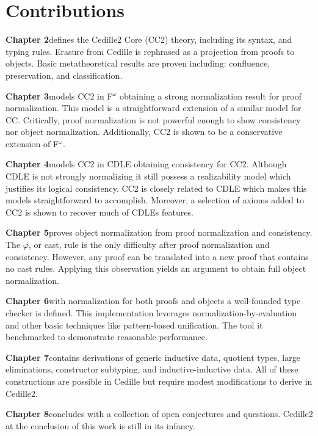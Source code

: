 \section{Contributions}

\textbf{Chapter 2}\quad defines the Cedille2 Core (CC2) theory, including its syntax, and typing rules.
Erasure from Cedille is rephrased as a projection from proofs to objects.
Basic metatheoretical results are proven including: confluence, preservation, and classification.

\textbf{Chapter 3}\quad models CC2 in F$^\omega$ obtaining a strong normalization result for proof normalization.
This model is a straightforward extension of a similar model for CC.
Critically, proof normalization is not powerful enough to show consistency nor object normalization.
Additionally, CC2 is shown to be a conservative extension of F$^\omega$.

\textbf{Chapter 4}\quad models CC2 in CDLE obtaining consistency for CC2.
Although CDLE is not strongly normalizing it still possess a realizability model which justifies its logical consistency.
CC2 is closely related to CDLE which makes this models straightforward to accomplish.
Moreover, a selection of axioms added to CC2 is shown to recover much of CDLEs features.

\textbf{Chapter 5}\quad proves object normalization from proof normalization and consistency.
The $\varphi$, or cast, rule is the only difficulty after proof normalization and consistency.
However, any proof can be translated into a new proof that contains no cast rules.
Applying this observation yields an argument to obtain full object normalization.

\textbf{Chapter 6}\quad with normalization for both proofs and objects a well-founded type checker is defined.
This implementation leverages normalization-by-evaluation and other basic techniques like pattern-based unification.
The tool it benchmarked to demonstrate reasonable performance.

\textbf{Chapter 7}\quad contains derivations of generic inductive data, quotient types, large eliminations, constructor subtyping, and inductive-inductive data.
All of these constructions are possible in Cedille but require modest modifications to derive in Cedille2.

\textbf{Chapter 8}\quad concludes with a collection of open conjectures and questions.
Cedille2 at the conclusion of this work is still in its infancy.